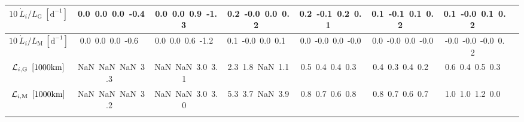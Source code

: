 \begin{table}[H]
{\begin{centering}
\begin{tabular}{|c|c|c|c|c|c|c|c|}
\hline
$10\ \dot{L}_{i}/L_{\mathrm{G}}\ \left[\mathrm{d^{-1}}\right]$ & \textcolor{C1}{0.0}\ \textcolor{C2}{0.0}\ \textcolor{C3}{0.0}\ \textcolor{C4}{-0.4}\  & \textcolor{C1}{0.0}\ \textcolor{C2}{0.0}\ \textcolor{C3}{0.9}\ \textcolor{C4}{-1.3}\  & \textcolor{C1}{0.2}\ \textcolor{C2}{-0.0}\ \textcolor{C3}{0.0}\ \textcolor{C4}{0.2}\  & \textcolor{C1}{0.2}\ \textcolor{C2}{-0.1}\ \textcolor{C3}{0.2}\ \textcolor{C4}{0.1}\  & \textcolor{C1}{0.1}\ \textcolor{C2}{-0.1}\ \textcolor{C3}{0.1}\ \textcolor{C4}{0.2}\  & \textcolor{C1}{0.1}\ \textcolor{C2}{-0.0}\ \textcolor{C3}{0.1}\ \textcolor{C4}{0.2}\  \tabularnewline
\hline
$10\ \dot{L}_{i}/L_{\mathrm{M}}\ \left[\mathrm{d^{-1}}\right]$ & \textcolor{C1}{0.0}\ \textcolor{C2}{0.0}\ \textcolor{C3}{0.0}\ \textcolor{C4}{-0.6}\  & \textcolor{C1}{0.0}\ \textcolor{C2}{0.0}\ \textcolor{C3}{0.6}\ \textcolor{C4}{-1.2}\  & \textcolor{C1}{0.1}\ \textcolor{C2}{-0.0}\ \textcolor{C3}{0.0}\ \textcolor{C4}{0.1}\  & \textcolor{C1}{0.0}\ \textcolor{C2}{-0.0}\ \textcolor{C3}{0.0}\ \textcolor{C4}{-0.0}\  & \textcolor{C1}{0.0}\ \textcolor{C2}{-0.0}\ \textcolor{C3}{0.0}\ \textcolor{C4}{-0.0}\  & \textcolor{C1}{-0.0}\ \textcolor{C2}{-0.0}\ \textcolor{C3}{-0.0}\ \textcolor{C4}{0.2}\  \tabularnewline
\hline
${\cal L}_{i,\mathrm{G}}\ \left[1000\mathrm{km}\right]$ & \textcolor{C1}{NaN}\ \textcolor{C2}{NaN}\ \textcolor{C3}{NaN}\ \textcolor{C4}{3.3}\  & \textcolor{C1}{NaN}\ \textcolor{C2}{NaN}\ \textcolor{C3}{3.0}\ \textcolor{C4}{3.1}\  & \textcolor{C1}{2.3}\ \textcolor{C2}{1.8}\ \textcolor{C3}{NaN}\ \textcolor{C4}{1.1}\  & \textcolor{C1}{0.5}\ \textcolor{C2}{0.4}\ \textcolor{C3}{0.4}\ \textcolor{C4}{0.3}\  & \textcolor{C1}{0.4}\ \textcolor{C2}{0.3}\ \textcolor{C3}{0.4}\ \textcolor{C4}{0.2}\  & \textcolor{C1}{0.6}\ \textcolor{C2}{0.4}\ \textcolor{C3}{0.5}\ \textcolor{C4}{0.3}\  \tabularnewline
\hline
${\cal L}_{i,\mathrm{M}}\ \left[1000\mathrm{km}\right]$ & \textcolor{C1}{NaN}\ \textcolor{C2}{NaN}\ \textcolor{C3}{NaN}\ \textcolor{C4}{3.2}\  & \textcolor{C1}{NaN}\ \textcolor{C2}{NaN}\ \textcolor{C3}{3.0}\ \textcolor{C4}{3.0}\  & \textcolor{C1}{5.3}\ \textcolor{C2}{3.7}\ \textcolor{C3}{NaN}\ \textcolor{C4}{3.9}\  & \textcolor{C1}{0.8}\ \textcolor{C2}{0.7}\ \textcolor{C3}{0.6}\ \textcolor{C4}{0.8}\  & \textcolor{C1}{0.8}\ \textcolor{C2}{0.7}\ \textcolor{C3}{0.6}\ \textcolor{C4}{0.7}\  & \textcolor{C1}{1.0}\ \textcolor{C2}{1.0}\ \textcolor{C3}{1.2}\ \textcolor{C4}{0.0}\  \tabularnewline
\hline
 &  &  &  &  &  & \tabularnewline
\hline
\end{tabular}
\par\end{centering} }
\end{table}
